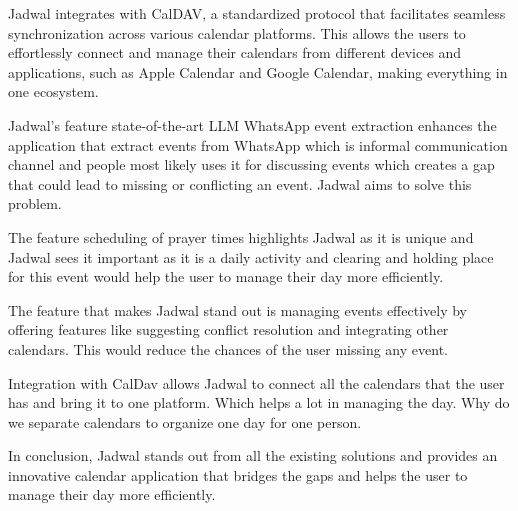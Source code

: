 \documentclass[12pt,a4paper]{report}
\begin{document}
Jadwal integrates with CalDAV, a standardized protocol that facilitates seamless synchronization across various calendar platforms. This allows the users to effortlessly connect and manage their calendars from different devices and applications, such as Apple Calendar and Google Calendar, making everything in one ecosystem. 

Jadwal's feature state-of-the-art LLM WhatsApp event extraction enhances the application that extract events from WhatsApp which is informal communication channel and people most likely uses it for discussing events which creates a gap that could lead to missing or conflicting an event. Jadwal aims to solve this problem.

The feature scheduling of prayer times highlights Jadwal as it is unique and Jadwal sees it important as it is a daily activity and clearing and holding place for this event would help the user to manage their day more efficiently.

The feature that makes Jadwal stand out is managing events effectively by offering features like suggesting conflict resolution and integrating other calendars. This would reduce the chances of the user missing any event.

Integration with CalDav allows Jadwal to connect all the calendars that the user has and bring it to one platform. Which helps a lot in managing the day. Why do we separate calendars to organize one day for one person. 

In conclusion, Jadwal stands out from all the existing solutions and provides an innovative calendar application that bridges the gaps and helps the user to manage their day more efficiently.




\end{document}
